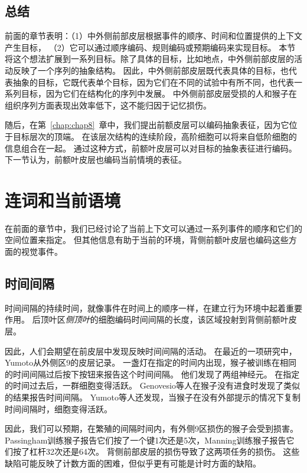 \subsection{总结}

前面的章节表明：（1）中外侧前部皮层根据事件的顺序、时间和位置提供的上下文产生目标，
（2）它可以通过顺序编码、规则编码或预期编码来实现目标。
本节将这个想法扩展到一系列目标。除了具体的目标，比如地点，中外侧前部皮层的活动反映了一个序列的抽象结构。
因此，中外侧前部皮层既代表具体的目标，也代表抽象的目标，它既代表单个目标，因为它们在不同的试验中有所不同，也代表一系列目标，因为它们在结构化的序列中发展。
中外侧前部皮层受损的人和猴子在组织序列方面表现出效率低下，这不能归因于记忆损伤。


随后，在第~\ref{chap:chap8}~章中，我们提出前额皮层可以编码抽象表征，因为它位于目标层次的顶端。
在该层次结构的连续阶段，高阶细胞可以将来自低阶细胞的信息组合在一起。
通过这种方式，前额叶皮层可以对目标的抽象表征进行编码。
下一节认为，前额叶皮层也编码当前情境的表征。



\section{连词和当前语境}

在前面的章节中，我们已经讨论了当前上下文可以通过一系列事件的顺序和它们的空间位置来指定。
但其他信息有助于当前的环境，背侧前额叶皮层也编码这些方面的视觉事件。


\subsection{时间间隔}

时间间隔的持续时间，就像事件在时间上的顺序一样，在建立行为环境中起着重要作用。
后顶叶区\textit{侧顶叶}的细胞编码时间间隔的长度\cite{leon2003representation}，该区域投射到背侧前额叶皮层。


因此，人们会期望在前皮层中发现反映时间间隔的活动。
在最近的一项研究中，Yumoto\cite{yumoto2011neural}从外侧区9的皮层记录。
一盏灯在指定的时间内出现，猴子被训练在相同的时间间隔过后按下按钮来报告这个时间间隔。
他们发现了两组神经元。
在指定的时间过去后，一群细胞变得活跃。
Genovesio等人\cite{genovesio2006neuronal}在猴子没有进食时发现了类似的结果报告时间间隔。
Yumoto等人还发现，当猴子在没有外部提示的情况下复制时间间隔时，细胞变得活跃。


因此，我们可以预期，在繁殖的间隔时间内，有外侧9区损伤的猴子会受到损害。
Passingham\cite{passingham1978information}训练猴子报告它们按了一个键1次还是5次，Manning\cite{manning1978dorsolateral}训练猴子报告它们按了杠杆32次还是64次。
背侧前部皮层的损伤导致了这两项任务的损伤。
这些缺陷可能反映了计数方面的困难，但似乎更有可能是计时方面的缺陷。



